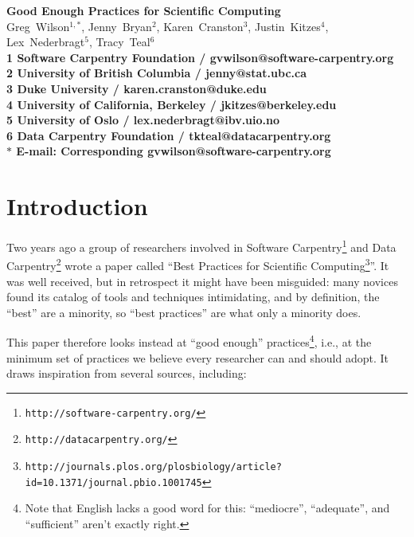 \documentclass[10pt]{article}
\date{}
\newcommand{\withurl}[2]{{#1}\footnote{\texttt{#2}}}
\begin{document}
\begin{flushleft}
{\Large
\textbf{Good Enough Practices for Scientific Computing}
}
\\
{Greg~Wilson}$^{1,\ast}$,
{Jenny~Bryan}$^{2}$,
{Karen~Cranston}$^{3}$,
{Justin~Kitzes}$^{4}$,
{Lex~Nederbragt}$^{5}$,
{Tracy~Teal}$^{6}$
\\
\bf{1} Software Carpentry Foundation / gvwilson@software-carpentry.org
\\
\bf{2} University of British Columbia / jenny@stat.ubc.ca
\\
\bf{3} Duke University / karen.cranston@duke.edu
\\
\bf{4} University of California, Berkeley / jkitzes@berkeley.edu
\\
\bf{5} University of Oslo / lex.nederbragt@ibv.uio.no
\\
\bf{6} Data Carpentry Foundation / tkteal@datacarpentry.org
\\
$\ast$ E-mail: Corresponding gvwilson@software-carpentry.org
\end{flushleft}

\section{Introduction}\label{introduction}

Two years ago a group of researchers involved in \withurl{Software
  Carpentry}{http://software-carpentry.org/} and \withurl{Data
  Carpentry}{http://datacarpentry.org/} wrote a paper called
``\withurl{Best Practices for Scientific
  Computing}{http://journals.plos.org/plosbiology/article?id=10.1371/journal.pbio.1001745}''. It
was well received, but in retrospect it might have been misguided:
many novices found its catalog of tools and techniques intimidating,
and by definition, the ``best'' are a minority, so ``best practices''
are what only a minority does.

This paper therefore looks instead at ``good enough''
practices\footnote{Note that English lacks a good word for this:
  ``mediocre'', ``adequate'', and ``sufficient'' aren't exactly
  right.}, i.e., at the minimum set of practices we believe every
researcher can and should adopt. It draws inspiration from several
sources, including:
\end{document}
